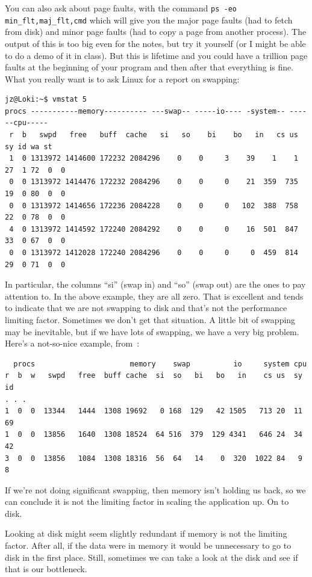\documentclass[a4paper]{report}
\begin{document}
You can also ask about page faults, with the command \texttt{ps -eo min\_flt,maj\_flt,cmd} which will give you the major page faults (had to fetch from disk) and minor page faults (had to copy a page from another process). The output of this is too big even for the notes, but try it yourself (or I might be able to do a demo of it in class). But this is lifetime and you could have a trillion page faults at the beginning of your program and then after that everything is fine. What you really want is to ask Linux for a report on swapping:

\begin{verbatim}
jz@Loki:~$ vmstat 5
procs -----------memory---------- ---swap-- -----io---- -system-- ------cpu-----
 r  b   swpd   free   buff  cache   si   so    bi    bo   in   cs us sy id wa st
 1  0 1313972 1414600 172232 2084296    0    0     3    39    1    1 27  1 72  0  0
 0  0 1313972 1414476 172232 2084296    0    0     0    21  359  735 19  0 80  0  0
 0  0 1313972 1414656 172236 2084228    0    0     0   102  388  758 22  0 78  0  0
 4  0 1313972 1414592 172240 2084292    0    0     0    16  501  847 33  0 67  0  0
 0  0 1313972 1412028 172240 2084296    0    0     0     0  459  814 29  0 71  0  0
\end{verbatim}

In particular, the columns ``si'' (swap in) and ``so'' (swap out) are the ones to pay attention to. In the above example, they are all zero. That is excellent and tends to indicate that we are not swapping to disk and that's not the performance limiting factor. Sometimes we don't get that situation. A little bit of swapping may be inevitable, but if we have lots of swapping, we have a very big problem. Here's a not-so-nice example, from~\cite{vmstat}:

\begin{verbatim}
  procs                      memory    swap          io     system cpu
r  b  w   swpd   free  buff cache  si  so   bi   bo   in    cs us  sy  id
. . .
1  0  0  13344   1444  1308 19692   0 168  129   42 1505   713 20  11  69
1  0  0  13856   1640  1308 18524  64 516  379  129 4341   646 24  34  42
3  0  0  13856   1084  1308 18316  56  64   14    0  320  1022 84   9   8
\end{verbatim}

If we're not doing significant swapping, then memory isn't holding us back, so we can conclude it is not the limiting factor in scaling the application up. On to disk.

Looking at disk might seem slightly redundant if memory is not the limiting factor. After all, if the data were in memory it would be unnecessary to go to disk in the first place. Still, sometimes we can take a look at the disk and see if that is our bottleneck.
\end{document}
